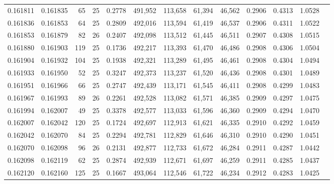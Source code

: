 \begin{tabular}{rrrrrrrrrrrrr}
0.161811 & 0.161835 &    65 &  25 &                                     0.2778 & 491,952 & 113,658 &  61,394 &  46,562 & 0.2906 & 0.4313 & 1.0528 \\
0.161836 & 0.161853 &    64 &  25 &                                     0.2809 & 492,016 & 113,594 &  61,419 &  46,537 & 0.2906 & 0.4311 & 1.0522 \\
0.161853 & 0.161879 &    82 &  26 &                                     0.2407 & 492,098 & 113,512 &  61,445 &  46,511 & 0.2907 & 0.4308 & 1.0515 \\
0.161880 & 0.161903 &   119 &  25 &                                     0.1736 & 492,217 & 113,393 &  61,470 &  46,486 & 0.2908 & 0.4306 & 1.0504 \\
0.161904 & 0.161932 &   104 &  25 &                                     0.1938 & 492,321 & 113,289 &  61,495 &  46,461 & 0.2908 & 0.4304 & 1.0494 \\
0.161933 & 0.161950 &    52 &  25 &                                     0.3247 & 492,373 & 113,237 &  61,520 &  46,436 & 0.2908 & 0.4301 & 1.0489 \\
0.161951 & 0.161966 &    66 &  25 &                                     0.2747 & 492,439 & 113,171 &  61,545 &  46,411 & 0.2908 & 0.4299 & 1.0483 \\
0.161967 & 0.161993 &    89 &  26 &                                     0.2261 & 492,528 & 113,082 &  61,571 &  46,385 & 0.2909 & 0.4297 & 1.0475 \\
0.161994 & 0.162007 &    49 &  25 &                                     0.3378 & 492,577 & 113,033 &  61,596 &  46,360 & 0.2909 & 0.4294 & 1.0470 \\
0.162007 & 0.162042 &   120 &  25 &                                     0.1724 & 492,697 & 112,913 &  61,621 &  46,335 & 0.2910 & 0.4292 & 1.0459 \\
0.162042 & 0.162070 &    84 &  25 &                                     0.2294 & 492,781 & 112,829 &  61,646 &  46,310 & 0.2910 & 0.4290 & 1.0451 \\
0.162070 & 0.162098 &    96 &  26 &                                     0.2131 & 492,877 & 112,733 &  61,672 &  46,284 & 0.2911 & 0.4287 & 1.0442 \\
0.162098 & 0.162119 &    62 &  25 &                                     0.2874 & 492,939 & 112,671 &  61,697 &  46,259 & 0.2911 & 0.4285 & 1.0437 \\
0.162120 & 0.162160 &   125 &  25 &                                     0.1667 & 493,064 & 112,546 &  61,722 &  46,234 & 0.2912 & 0.4283 & 1.0425 \\

\end{tabular}
